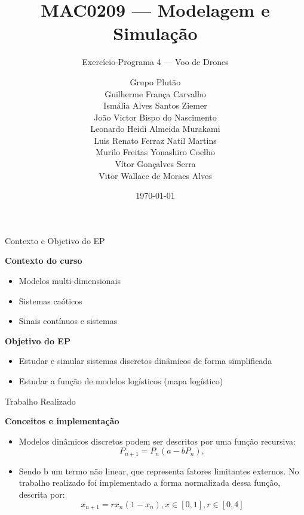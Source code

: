 \documentclass[aspectratio=169]{beamer}
\title{MAC0209 --- Modelagem e Simulação}
\subtitle{Exercício-Programa 4 --- Voo de Drones}
\author[Grupo Plutão]{Grupo Plutão \\[4pt]
Guilherme França Carvalho \\
Ismália Alves Santos Ziemer \\
João Victor Bispo do Nascimento \\
Leonardo Heidi Almeida Murakami \\
Luis Renato Ferraz Natil Martins \\
Murilo Freitas Yonashiro Coelho \\
Vítor Gonçalves Serra \\
Vitor Wallace de Moraes Alves }
\institute[BCC IME-USP]{Bacharelado em Ciência da Computação \\ IME -- USP}
\date{\today}
\begin{document}
\begin{frame}
\titlepage
\end{frame}

\begin{frame}{Contexto e Objetivo do EP}

\textbf{Contexto do curso}

\begin{itemize}
    \item Modelos multi-dimensionais
    \item Sistemas caóticos
    \item Sinais contínuos e sistemas
\end{itemize}

\vspace{0.5cm}

\textbf{Objetivo do EP}

\begin{itemize}
    \item Estudar e simular sistemas discretos dinâmicos de forma simplificada
    \item Estudar a função de modelos logísticos (mapa logístico)
\end{itemize}

\end{frame}

\begin{frame}{Trabalho Realizado}

\textbf{Conceitos e implementação}

\begin{itemize}
    \item Modelos dinâmicos discretos podem ser descritos por uma função recursiva:
    \begin{equation}
    P_{n+1} = P_n(a-bP_n),
    \end{equation}
    \item Sendo b um termo não linear, que representa fatores limitantes externos. No trabalho realizado foi implementado a forma normalizada dessa função, descrita por:
    \begin{equation}
        x_{n+1} = rx_n(1-x_n),x\in[0,1],r\in[0,4]
    \end{equation}
\end{itemize}

\end{frame}
\end{document}

